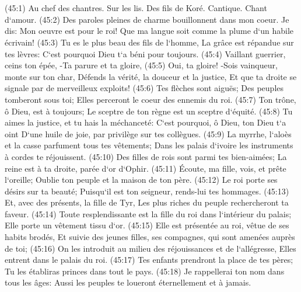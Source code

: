 \chapter{}

\verse (45:1) Au chef des chantres. Sur les lis. Des fils de Koré. Cantique. Chant d`amour. (45:2) Des paroles pleines de charme bouillonnent dans mon coeur. Je dis: Mon oeuvre est pour le roi! Que ma langue soit comme la plume d`un habile écrivain! 
\verse (45:3) Tu es le plus beau des fils de l`homme, La grâce est répandue sur tes lèvres: C`est pourquoi Dieu t`a béni pour toujours. 
\verse (45:4) Vaillant guerrier, ceins ton épée, -Ta parure et ta gloire, 
\verse (45:5) Oui, ta gloire! -Sois vainqueur, monte sur ton char, Défends la vérité, la douceur et la justice, Et que ta droite se signale par de merveilleux exploits! 
\verse (45:6) Tes flèches sont aiguës; Des peuples tomberont sous toi; Elles perceront le coeur des ennemis du roi. 
\verse (45:7) Ton trône, ô Dieu, est à toujours; Le sceptre de ton règne est un sceptre d`équité. 
\verse (45:8) Tu aimes la justice, et tu hais la méchanceté: C`est pourquoi, ô Dieu, ton Dieu t`a oint D`une huile de joie, par privilège sur tes collègues. 
\verse (45:9) La myrrhe, l`aloès et la casse parfument tous tes vêtements; Dans les palais d`ivoire les instruments à cordes te réjouissent. 
\verse (45:10) Des filles de rois sont parmi tes bien-aimées; La reine est à ta droite, parée d`or d`Ophir. 
\verse (45:11) Écoute, ma fille, vois, et prête l`oreille; Oublie ton peuple et la maison de ton père. 
\verse (45:12) Le roi porte ses désirs sur ta beauté; Puisqu`il est ton seigneur, rends-lui tes hommages. 
\verse (45:13) Et, avec des présents, la fille de Tyr, Les plus riches du peuple rechercheront ta faveur. 
\verse (45:14) Toute resplendissante est la fille du roi dans l`intérieur du palais; Elle porte un vêtement tissu d`or. 
\verse (45:15) Elle est présentée au roi, vêtue de ses habits brodés, Et suivie des jeunes filles, ses compagnes, qui sont amenées auprès de toi; 
\verse (45:16) On les introduit au milieu des réjouissances et de l`allégresse, Elles entrent dans le palais du roi. 
\verse (45:17) Tes enfants prendront la place de tes pères; Tu les établiras princes dans tout le pays. 
\verse (45:18) Je rappellerai ton nom dans tous les âges: Aussi les peuples te loueront éternellement et à jamais. 

\chapter{}


